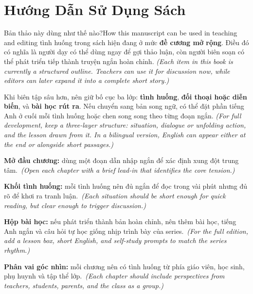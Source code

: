 \chapter*{Hướng Dẫn Sử Dụng Sách}

\begin{truyen}{Bản thảo này dùng như thế nào?}{How this manuscript can be used in teaching and editing}
 tình huống trong sách hiện đang ở mức \textbf{đề cương mở rộng}. Điều đó có nghĩa là người dạy có thể dùng ngay để gợi thảo luận, còn người biên soạn có thể phát triển tiếp thành truyện ngắn hoàn chỉnh.
\textit{(Each item in this book is currently a structured outline. Teachers can use it for discussion now, while editors can later expand it into a complete short story.)}

Khi biên tập sâu hơn, nên giữ bố cục ba lớp: \textbf{tình huống}, \textbf{đối thoại hoặc diễn biến}, và \textbf{bài học rút ra}. Nếu chuyển sang bản song ngữ, có thể đặt phần tiếng Anh ở cuối mỗi tình huống hoặc chen song song theo từng đoạn ngắn.
\textit{(For full development, keep a three-layer structure: situation, dialogue or unfolding action, and the lesson drawn from it. In a bilingual version, English can appear either at the end or alongside short passages.)}
\end{truyen}

\vspace{6pt}

\begin{tcolorbox}[
	colback=truyengold!8,
	colframe=truyengold!70!black,
	coltitle=black,
	fonttitle=\bfseries,
	title={Gợi Ý Đồng Bộ Theo Series \quad\textit{(Series Alignment Guide)}},
	arc=4pt, boxrule=1pt, breakable, enhanced
]
\smallskip
\textbf{Mở đầu chương:} dùng một đoạn dẫn nhập ngắn để xác định xung đột trung tâm.\
\textit{(Open each chapter with a brief lead-in that identifies the core tension.)}

\medskip
\textbf{Khối tình huống:} mỗi tình huống nên đủ ngắn để đọc trong vài phút nhưng đủ rõ để khơi ra tranh luận.\
\textit{(Each situation should be short enough for quick reading, but clear enough to trigger discussion.)}

\medskip
\textbf{Hộp bài học:} nếu phát triển thành bản hoàn chỉnh, nên thêm bài học, tiếng Anh ngắn và câu hỏi tự học giống nhịp trình bày của series.\
\textit{(For the full edition, add a lesson box, short English, and self-study prompts to match the series rhythm.)}

\medskip
\textbf{Phân vai góc nhìn:} mỗi chương nên có tình huống từ phía giáo viên, học sinh, phụ huynh và tập thể lớp.\
\textit{(Each chapter should include perspectives from teachers, students, parents, and the class as a group.)}
\smallskip
\end{tcolorbox}

